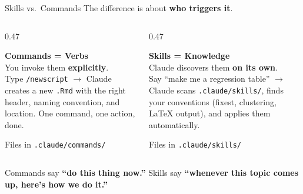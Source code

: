 \documentclass[aspectratio=169, 11pt]{beamer}
\newcommand{\emphgold}[1]{\alert{\textbf{#1}}}
\begin{document}
\begin{frame}{Skills vs.\ Commands}
{\small The difference is about \emphgold{who triggers it}.}

\vspace{0.1cm}
\begin{columns}[T]
\begin{column}{0.47\textwidth}
  \begin{tcolorbox}[
    enhanced, colback=navy!8, colframe=navy!40, boxrule=0.5pt,
    sharp corners, left=8pt, right=8pt, top=5pt, bottom=5pt,
  ]
    {\normalsize\bfseries\color{navy} Commands = Verbs}\\[4pt]
    {\small You invoke them \emphgold{explicitly}.}\\[4pt]
    {\scriptsize Type \texttt{/newscript} $\rightarrow$ Claude creates a new \texttt{.Rmd} with the right header, naming convention, and location. One command, one action, done.}
  \end{tcolorbox}
  \vspace{0.05cm}
  {\scriptsize\color{slate} Files in \texttt{.claude/commands/}}
\end{column}
\begin{column}{0.47\textwidth}
  \begin{tcolorbox}[
    enhanced, colback=gold!8, colframe=gold!60, boxrule=0.5pt,
    sharp corners, left=8pt, right=8pt, top=5pt, bottom=5pt,
  ]
    {\normalsize\bfseries\color{navy} Skills = Knowledge}\\[4pt]
    {\small Claude discovers them \emphgold{on its own}.}\\[4pt]
    {\scriptsize Say ``make me a regression table'' $\rightarrow$ Claude scans \texttt{.claude/skills/}, finds your conventions (fixest, clustering, \LaTeX{} output), and applies them automatically.}
  \end{tcolorbox}
  \vspace{0.05cm}
  {\scriptsize\color{slate} Files in \texttt{.claude/skills/}}
\end{column}
\end{columns}

\vspace{0.1cm}
\begin{keyinsight}
  {\small Commands say \emphgold{``do this thing now.''}  Skills say \emphgold{``whenever this topic comes up, here's how we do it.''}}
\end{keyinsight}
\end{frame}
\end{document}

